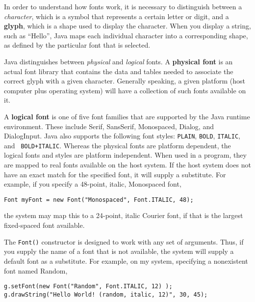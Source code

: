 In order to understand how fonts work, it is necessary to distinguish
between a {\em character}, which is a symbol that represents a certain
letter or digit, and a {\bf glyph}, which is a shape used to display
the character.  When you display a string, such as ``Hello'', Java
maps each individual character into a corresponding shape, as defined
by the particular font that is selected. 

Java distinguishes between {\em physical} and {\em logical} fonts.  A
{\bf physical font} is an actual font library that contains the data
and tables needed to associate the correct glyph with a given
character.  Generally speaking, a given platform (host computer plus
operating system) will have a collection of such fonts available on
it.

A {\bf logical font} is one of five font families that are supported
by the Java runtime environment. These include Serif, SansSerif,
Monospaced, Dialog, and DialogInput.  Java also supports the following
font styles: {\tt PLAIN}, {\tt BOLD}, {\tt ITALIC}, and {\tt
BOLD+ITALIC}.  Whereas the physical fonts are platform dependent, the
logical fonts and styles are platform independent. When used in a
program, they are mapped to real fonts available on the host system.
If the host system does not have an exact match for the specified
font, it will supply a substitute.  For example, if you specify a
48-point, italic, Monospaced font,

\begin{jjjlisting}
\begin{lstlisting}
Font myFont = new Font("Monospaced", Font.ITALIC, 48);
\end{lstlisting}
\end{jjjlisting}

\noindent the system may map this to a 24-point, italic
Courier font, if that is the largest fixed-spaced font available.

The {\tt Font()} constructor is designed to work with any set of
arguments.  Thus, if you supply the name of a font that is not
available, the system will supply a default font as a substitute.  For
example, on my system, specifying a nonexistent font named Random,

\begin{jjjlisting}
\begin{lstlisting}
g.setFont(new Font("Random", Font.ITALIC, 12) );
g.drawString("Hello World! (random, italic, 12)", 30, 45);
\end{lstlisting}
\end{jjjlisting}

